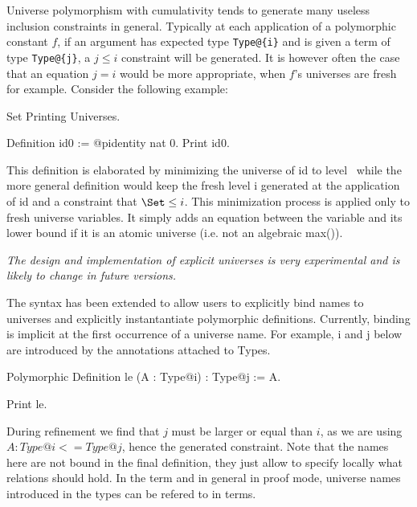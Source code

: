 
Universe polymorphism with cumulativity tends to generate many useless
inclusion constraints in general. Typically at each application of a
polymorphic constant $f$, if an argument has expected type
\verb|Type@{i}| and is given a term of type \verb|Type@{j}|, a $j \le i$
constraint will be generated. It is however often the case that an
equation $j = i$ would be more appropriate, when $f$'s
universes are fresh for example. Consider the following example:

\begin{coq_eval}
Set Printing Universes.
\end{coq_eval}
\begin{coq_example}
Definition id0 := @pidentity nat 0.
Print id0.
\end{coq_example}

This definition is elaborated by minimizing the universe of id to level
\Set~while the more general definition would keep the fresh level i
generated at the application of id and a constraint that $\Set \le i$.
This minimization process is applied only to fresh universe
variables. It simply adds an equation between the variable and its lower
bound if it is an atomic universe (i.e. not an algebraic max()).


\begin{flushleft}
  \em The design and implementation of explicit universes is very
  experimental and is likely to change in future versions.
\end{flushleft}

The syntax has been extended to allow users to explicitly bind names to
universes and explicitly instantantiate polymorphic
definitions. Currently, binding is implicit at the first occurrence of a 
universe name. For example, i and j below are introduced by the
annotations attached to Types. 

\begin{coq_example*}
Polymorphic Definition le (A : Type@{i}) : Type@{j} := A.
\end{coq_example*}
\begin{coq_example}
Print le.
\end{coq_example}

During refinement we find that $j$ must be larger or equal than $i$, as
we are using $A : Type@{i} <= Type@{j}$, hence the generated
constraint. Note that the names here are not bound in the final
definition, they just allow to specify locally what relations should
hold. In the term and in general in proof mode, universe names
introduced in the types can be refered to in terms.

